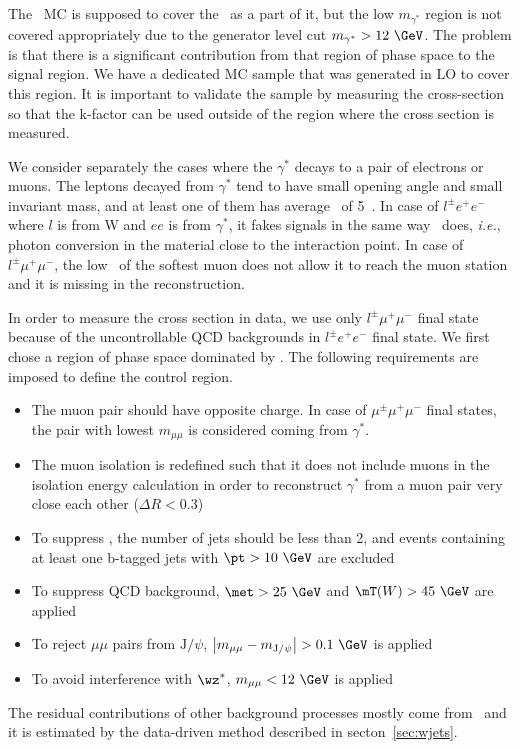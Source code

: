 The \wz\ MC is supposed to cover the \wgammastar\ as a part of it, 
but the low $m_{\gamma^*}$ region is not covered appropriately due to the generator 
level cut $m_{\gamma^*}>12~\GeV$. The problem is that there is a significant 
contribution from that region of phase space to the signal region.
We have a dedicated MC sample that was generated in LO to cover this region.
It is important to validate the sample by measuring the cross-section 
so that the k-factor can be used outside of the region 
where the cross section is measured. 

We consider separately 
the cases where the $\gamma^*$ decays to a pair of electrons or muons. 
The leptons decayed from $\gamma^*$ tend to have small opening angle 
and small invariant mass, and at least one of them has average \pt\ of 5~\GeV.
In case of $l^\pm e^+ e^-$ where $l$ is from W and $ee$ is from $\gamma^*$, 
it fakes signals in the same way \wgamma\ does, \textit{i.e.}, 
photon conversion in the material close to the interaction point.
In case of $l^\pm\mu^+\mu^-$, the low \pt\ of the softest muon does not allow 
it to reach the muon station and it is missing in the reconstruction. 

In order to measure the cross section in data, we use only $l^\pm\mu^+\mu^-$ final state 
because of the uncontrollable QCD backgrounds in $l^\pm e^+ e^-$ final state. 
We first chose a region of phase space dominated by \wgammastar. 
The following requirements are imposed to define the control region. 
\begin{itemize} 
\item The muon pair should have opposite charge. In case of $\mu^\pm\mu^+\mu^-$ final states, 
      the pair with lowest $m_{\mu\mu}$ is considered coming from $\gamma^*$.
\item The muon isolation is redefined such that it does not include muons in the isolation 
      energy calculation in order to reconstruct $\gamma^*$ from a muon pair very close each other 
      ($\Delta R < 0.3$)
\item To suppress \topbkg, the number of jets should be less than 2, and events containing at least 
      one b-tagged jets with $\pt>10~\GeV$ are excluded
\item To suppress QCD background, $\met>25~\GeV$ and $\mT(W)>45~\GeV$ are applied 
\item To reject $\mu\mu$ pairs from $\textrm{J}/\psi$, 
      $\left| m_{\mu\mu} - m_{\textrm{J}/\psi}\right| > 0.1~\GeV$ is applied
\item To avoid interference with $\wz^*$, $m_{\mu\mu} < 12~\GeV$ is applied
\end{itemize} 
The residual contributions of other background processes mostly come from \Wjets\ 
and it is estimated by the data-driven method described in secton~\ref{sec:wjets}.

